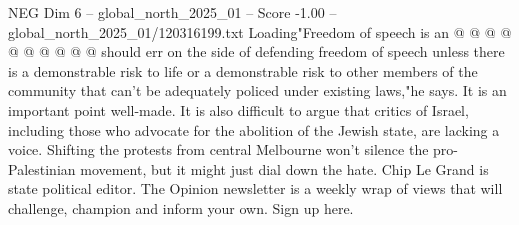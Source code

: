 \begin{textsample}{NEG Dim 6 – global\_north\_2025\_01 – Score -1.00 – global\_north\_2025\_01/120316199.txt}
Loading"Freedom of speech is an @ @ @ @ @ @ @ @ @ @ should err on the side of defending freedom of speech unless there is a demonstrable risk to life or a demonstrable risk to other members of the community that can't be adequately policed under existing laws,"he says.
It is an important point well-made.
It is also difficult to argue that critics of Israel, including those who advocate for the abolition of the Jewish state, are lacking a voice.
Shifting the protests from central Melbourne won't silence the pro-Palestinian movement, but it might just dial down the hate.
Chip Le Grand is state political editor.
The Opinion newsletter is a weekly wrap of views that will challenge, champion and inform your own.
Sign up here.

\end{textsample}
